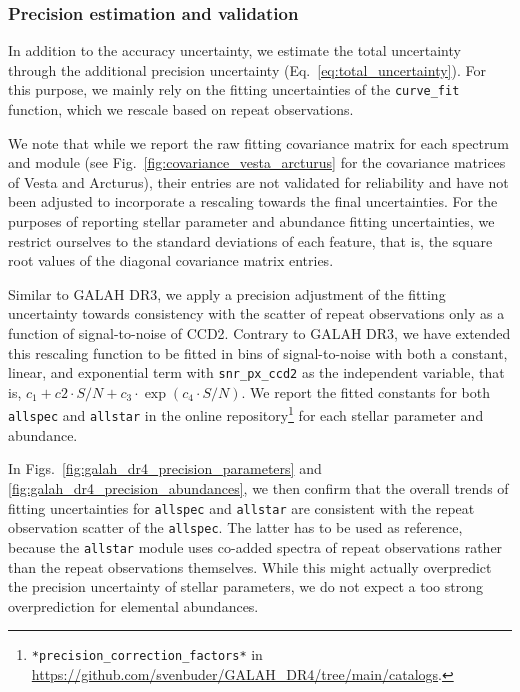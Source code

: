 \documentclass[
  journal=pasa,
  manuscript=research-paper, %
  year=2024,
  volume=37
]{cup-journal}
\begin{document}
\subsubsection{Precision estimation and validation} \label{sec:uncertainty_precision}

In addition to the accuracy uncertainty, we estimate the total uncertainty through the additional precision uncertainty (Eq.~\ref{eq:total_uncertainty}). For this purpose, we mainly rely on the fitting uncertainties of the \texttt{curve\_fit} function, which we rescale based on repeat observations.

We note that while we report the raw fitting covariance matrix for each spectrum and module (see Fig.~\ref{fig:covariance_vesta_arcturus} for the covariance matrices of Vesta and Arcturus), their entries are not validated for reliability and have not been adjusted to incorporate a rescaling towards the final uncertainties. For the purposes of reporting stellar parameter and abundance fitting uncertainties, we restrict ourselves to the standard deviations of each feature, that is, the square root values of the diagonal covariance matrix entries.

Similar to GALAH DR3, we apply a precision adjustment of the fitting uncertainty towards consistency with the scatter of repeat observations only as a function of signal-to-noise of CCD2. Contrary to GALAH DR3, we have extended this rescaling function to be fitted in bins of signal-to-noise with both a constant, linear, and exponential term with \texttt{snr\_px\_ccd2} as the independent variable, that is, $c_1 + c2 \cdot S/N + c_3 \cdot \exp(c_4 \cdot S/N)$. We report the fitted constants for both \texttt{allspec} and \texttt{allstar} in the online repository\footnote{\texttt{*precision\_correction\_factors*} in \url{https://github.com/svenbuder/GALAH_DR4/tree/main/catalogs}.} for each stellar parameter and abundance. 

In Figs.~\ref{fig:galah_dr4_precision_parameters} and \ref{fig:galah_dr4_precision_abundances}, we then confirm that the overall trends of fitting uncertainties for \texttt{allspec} and \texttt{allstar} are consistent with the repeat observation scatter of the \texttt{allspec}. The latter has to be used as reference, because the \texttt{allstar} module uses co-added spectra of repeat observations rather than the repeat observations themselves. While this might actually overpredict the precision uncertainty of stellar parameters, we do not expect a too strong overprediction for elemental abundances.
\end{document}
